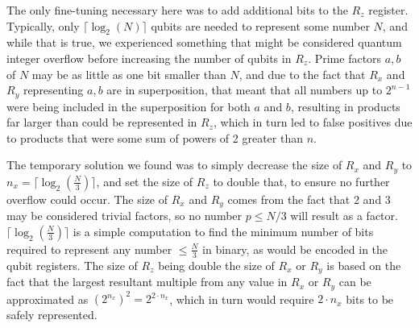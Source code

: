 \documentclass[twocolumn]{cinc}
\begin{document}
  The only fine-tuning necessary here was to add additional bits to the $R_z$ register.
  Typically, only $\lceil \log_2(N)\rceil$ qubits are needed to represent some number $N$,
  and while that is true, we experienced something that might be considered quantum integer
  overflow before increasing the number of qubits in $R_z$. Prime factors $a,b$ of $N$ may be as
  little as one bit smaller than $N$, and due to the fact that $R_x$ and $R_y$ representing $a,b$
  are in superposition, that meant that all numbers up to $2^{n-1}$ were being included
  in the superposition for both $a$ and $b$, resulting in products far larger than could
  be represented in $R_z$, which in turn led to false positives due to products that were
  some sum of powers of 2 greater than $n$.

  The temporary solution we found was to simply decrease the size of $R_x$ and $R_y$ to 
  $n_x=\lceil \log_2(\frac{N}{3})\rceil$, and set the size of $R_z$ to double that, to ensure no
  further overflow could occur. The size of $R_x$ and $R_y$ comes from the fact that $2$ and $3$ may
  be considered trivial factors, so no number $p \le N/3$ will result as a factor. 
  $\lceil\log_2(\frac{N}{3})\rceil$ is a simple computation to find the minimum number of bits required
  to represent any number $\le \frac{N}{3}$ in binary, as would be encoded in the qubit registers. The
  size of $R_z$ being double the size of $R_x$ or $R_y$ is based on the fact that the largest resultant
  multiple from any value in $R_x$ or $R_y$ can be approximated as ${(2^{n_x})}^2=2^{2\cdot n_x}$, which 
  in turn would require $2\cdot n_x$ bits to be safely represented. 
  



\end{document}
